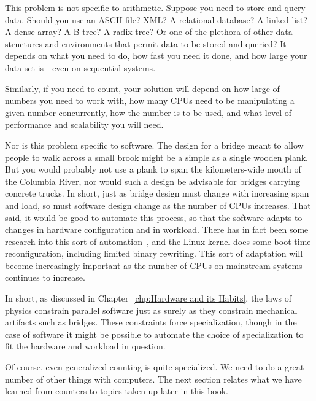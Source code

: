 \QuickQuizEnd

This problem is not specific to arithmetic.
Suppose you need to store and query data.
Should you use an ASCII file?
XML?
A relational database?
A linked list?
A dense array?
A B-tree?
A radix tree?
Or one of the plethora of other data
structures and environments that permit data to be stored and queried?
It depends on what you need to do, how fast you need it done, and how
large your data set is---even on sequential systems.

Similarly, if you need to count, your solution will depend on how large
of numbers you need to work with, how many CPUs need to be manipulating
a given number concurrently, how the number is to be used, and what
level of performance and scalability you will need.

Nor is this problem specific to software.
The design for a bridge meant to allow people to walk across a small brook
might be a simple as a single wooden plank.
But you would probably not use a plank to span the kilometers-wide mouth of
the Columbia River, nor would such a design be advisable for bridges
carrying concrete trucks.
In short, just as bridge design must change with increasing span and load,
so must software design change as the number of CPUs increases.
That said, it would be good to automate this process, so that the
software adapts to changes in hardware configuration and in workload.
There has in fact been some research into this sort of
automation~\cite{Appavoo03a,Soules03a}, and the Linux kernel does some
boot-time reconfiguration, including limited binary rewriting.
This sort of adaptation will become increasingly important as the
number of CPUs on mainstream systems continues to increase.

In short, as discussed in
Chapter~\ref{chp:Hardware and its Habits},
the laws of physics constrain parallel software just as surely as they
constrain mechanical artifacts such as bridges.
These constraints force specialization, though in the case of software
it might be possible to automate the choice of specialization to
fit the hardware and workload in question.

Of course, even generalized counting is quite specialized.
We need to do a great number of other things with computers.
The next section relates what we have learned from counters to
topics taken up later in this book.

